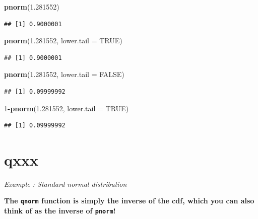\documentclass[]{book}
\newenvironment{Shaded}{\begin{snugshade}}{\end{snugshade}}
\newcommand{\DataTypeTok}[1]{\textcolor[rgb]{0.13,0.29,0.53}{#1}}
\newcommand{\DecValTok}[1]{\textcolor[rgb]{0.00,0.00,0.81}{#1}}
\newcommand{\FloatTok}[1]{\textcolor[rgb]{0.00,0.00,0.81}{#1}}
\newcommand{\KeywordTok}[1]{\textcolor[rgb]{0.13,0.29,0.53}{\textbf{#1}}}
\newcommand{\NormalTok}[1]{#1}
\newcommand{\OperatorTok}[1]{\textcolor[rgb]{0.81,0.36,0.00}{\textbf{#1}}}
\newcommand{\OtherTok}[1]{\textcolor[rgb]{0.56,0.35,0.01}{#1}}
\begin{document}
\begin{Shaded}
\begin{Highlighting}[]
\KeywordTok{pnorm}\NormalTok{(}\FloatTok{1.281552}\NormalTok{)}
\end{Highlighting}
\end{Shaded}

\begin{verbatim}
## [1] 0.9000001
\end{verbatim}

\begin{Shaded}
\begin{Highlighting}[]
\KeywordTok{pnorm}\NormalTok{(}\FloatTok{1.281552}\NormalTok{, }\DataTypeTok{lower.tail =} \OtherTok{TRUE}\NormalTok{)}
\end{Highlighting}
\end{Shaded}

\begin{verbatim}
## [1] 0.9000001
\end{verbatim}

\begin{Shaded}
\begin{Highlighting}[]
\KeywordTok{pnorm}\NormalTok{(}\FloatTok{1.281552}\NormalTok{, }\DataTypeTok{lower.tail =} \OtherTok{FALSE}\NormalTok{) }
\end{Highlighting}
\end{Shaded}

\begin{verbatim}
## [1] 0.09999992
\end{verbatim}

\begin{Shaded}
\begin{Highlighting}[]
\DecValTok{1}\OperatorTok{-}\KeywordTok{pnorm}\NormalTok{(}\FloatTok{1.281552}\NormalTok{, }\DataTypeTok{lower.tail =} \OtherTok{TRUE}\NormalTok{)}
\end{Highlighting}
\end{Shaded}

\begin{verbatim}
## [1] 0.09999992
\end{verbatim}

\hypertarget{qxxx}{%
\section{qxxx}\label{qxxx}}

\emph{Example : Standard normal distribution}

\textbf{The \texttt{qnorm} function is simply the inverse of the cdf, which you can also think of as the inverse of \texttt{pnorm}!}
\end{document}
